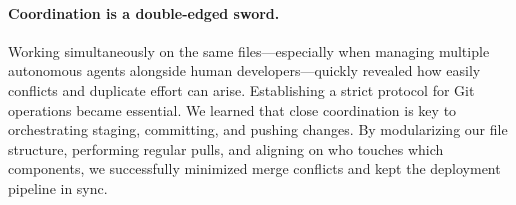 \paragraph{Coordination is a double-edged sword.} Working simultaneously on the same files—especially when managing multiple autonomous agents alongside human developers—quickly revealed how easily conflicts and duplicate effort can arise. Establishing a strict protocol for Git operations became essential. We learned that close coordination is key to orchestrating staging, committing, and pushing changes. By modularizing our file structure, performing regular pulls, and aligning on who touches which components, we successfully minimized merge conflicts and kept the deployment pipeline in sync.